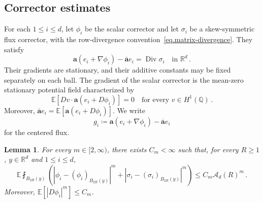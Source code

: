 \documentclass[11pt]{amsart}
\newtheorem{lemma}[proposition]{Lemma}
\theoremstyle{definition}
\theoremstyle{remark}
\numberwithin{equation}{section}
\newcommand{\E}{\mathbb E}
\newcommand{\Q}{\mathbb Q}
\newcommand{\R}{\mathbb R}
\renewcommand{\a}{\mathbf a}
\newcommand{\ahom}{\overline{\mathbf a}}
\newcommand{\Div}{\operatorname{Div}}
\newcommand{\cA}{\mathcal A}
\begin{document}
\subsection{Corrector estimates}\label{ss.corrector-estimates}

For each $1\leq i\leq d$, let $\phi_i$ be the scalar corrector and let $\sigma_i$ be a skew-symmetric flux corrector, with the row-divergence convention~\eqref{eq.matrix-divergence}. They satisfy
\begin{equation}\label{eq.extended-corrector}
 \a(e_i+\nabla\phi_i)-\ahom e_i=\Div\sigma_i
 \quad\text{in }\R^d\, .
\end{equation}
Their gradients are stationary, and their additive constants may be fixed separately on each ball. The gradient of the scalar corrector is the mean-zero stationary potential field characterized by
\begin{equation*}
 \E[Dv\cdot\a(e_i+D\phi_i)]=0
 \quad\text{for every }v\in H^1(\Q)\, .
\end{equation*}
Moreover, $\ahom e_i=\E[\a(e_i+D\phi_i)]$. We write
\begin{equation}\label{eq.centered-flux}
 g_i\coloneqq\a(e_i+\nabla\phi_i)-\ahom e_i
\end{equation}
for the centered flux.

\begin{lemma}\label{corrector.moments}
For every $m\in[2,\infty)$, there exists $C_m<\infty$ such that, for every $R\geq1$, $y\in\R^d$ and $1\leq i\leq d$,
\begin{equation}\label{eq.corrector-moments}
 \E\fint_{B_{2R}(y)}
 \left(|\phi_i-(\phi_i)_{B_{2R}(y)}|^m+
 |\sigma_i-(\sigma_i)_{B_{2R}(y)}|^m\right)
 \leq C_m\cA_d(R)^m\, .
\end{equation}
Moreover, $\E[|D\phi_i|^m]\leq C_m$.
\end{lemma}
\end{document}
